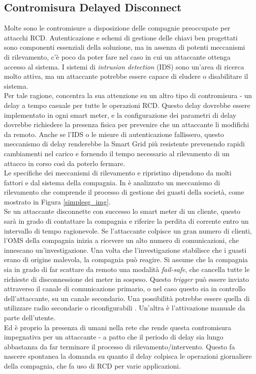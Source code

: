 \subsection{Contromisura Delayed Disconnect}
Molte sono le contromisure a disposizione delle compagnie preoccupate per attacchi RCD. Autenticazione e schemi di gestione delle chiavi ben progettati sono componenti essenziali della soluzione, ma in assenza di potenti meccanismi di rilevamento, c'è poco da poter fare nel caso in cui un attaccante ottenga accesso al sistema. I sistemi di \emph{intrusion detection} (IDS) sono un'area di ricerca molto attiva, ma un attaccante potrebbe essere capace di eludere o disabilitare il sistema.\\
Per tale ragione, \cite{delay} concentra la sua attenzione su un altro tipo di contromisura - un delay a tempo casuale per tutte le operazioni RCD. Questo delay dovrebbe essere implementato in ogni smart meter, e la configurazione dei parametri di delay dovrebbe richiedere la presenza fisica per prevenire che un attaccante li modifichi da remoto. Anche se l'IDS o le misure di autenticazione fallissero, questo meccanismo di delay renderebbe la Smart Grid più resistente prevenendo rapidi cambiamenti nel carico e fornendo il tempo necessario al rilevamento di un attacco in corso così da poterlo fermare.\\
Le specifiche dei meccanismi di rilevamento e ripristino dipendono da molti fattori e dal sistema della compagnia. In \cite{delay} è analizzato un meccanismo di rilevamento che comprende il processo di gestione dei guasti della società, come mostrato in Figura \ref{simplesg_img}.\\
Se un attaccante disconnette con successo lo smart meter di un cliente, questo sarà in grado di contattare la compagnia e riferire la perdita di corrente entro un intervallo di tempo ragionevole. Se l'attaccante colpisce un gran numero di clienti, l'OMS della compagnia inizia a ricevere un alto numero di comunicazioni, che innescano un'investigazione. Una volta che l'investigazione stabilisce che i guasti erano di origine malevola, la compagnia può reagire. Si assume che la compagnia sia in grado di far scattare da remoto una modalità \textit{fail-safe}, che cancella tutte le richieste di disconnessione dei meter in sospeso. Questo \emph{trigger} può essere inviato attraverso il canale di comunicazione primario, o nel caso questo sia in controllo dell'attaccante, su un canale secondario. Una possibilità potrebbe essere quella di utilizzare radio secondarie o riconfigurabili \cite{radio}. Un'altra è l'attivazione manuale da parte dell'utente.\\
Ed è proprio la presenza di umani nella rete che rende questa contromisura impegnativa per un attaccante - a patto che il periodo di delay sia lungo abbastanza da far terminare il processo di rilevamento/intervento. Questo fa nascere spontanea la domanda su quanto il delay colpisca le operazioni giornaliere della compagnia, che fa uso di RCD per varie applicazioni.
